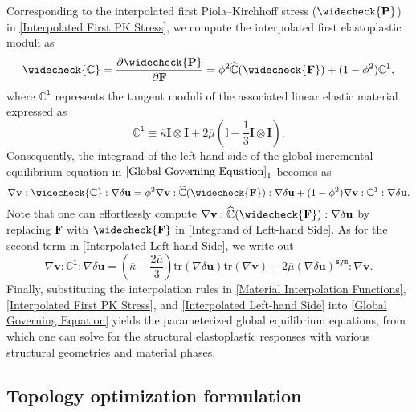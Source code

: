 \documentclass[preprint,11pt]{elsarticle}
\theoremstyle{definition}
\begin{document}
Corresponding to the interpolated first Piola--Kirchhoff stress ($\widecheck{\mathbf{P}}$) in \eqref{Interpolated First PK Stress}, we compute the interpolated first elastoplastic moduli as
\begin{equation*}
    \widecheck{\mathbb{C}} = \dfrac{\partial \widecheck{\mathbf{P}}}{\partial \mathbf{F}}
    = \phi^2 \widehat{\mathbb{C}}(\widecheck{\mathbf{F}}) + (1-\phi^2) \mathbb{C}^\texttt{l},
\end{equation*}
where $\mathbb{C}^\texttt{l}$ represents the tangent moduli of the associated linear elastic material expressed as
\begin{equation*}
    \mathbb{C}^\texttt{l} \equiv \overline{\kappa} \mathbf{I} \otimes \mathbf{I} + 2 \overline{\mu} \left( \mathbb{I} - \dfrac{1}{3} \mathbf{I} \otimes \mathbf{I} \right).
\end{equation*}
Consequently, the integrand of the left-hand side of the global incremental equilibrium equation in $\eqref{Global Governing Equation}_1$ becomes as
\begin{equation} \label{Interpolated Left-hand Side}
    \nabla \mathbf{v} : \widecheck{\mathbb{C}} : \nabla \delta \mathbf{u} = \phi^2 \nabla \mathbf{v} : \widehat{\mathbb{C}}(\widecheck{\mathbf{F}}) : \nabla \delta \mathbf{u} + (1-\phi^2) \nabla \mathbf{v} : \mathbb{C}^\texttt{l} : \nabla \delta \mathbf{u}.
\end{equation}
Note that one can effortlessly compute $\nabla \mathbf{v} : \widehat{\mathbb{C}}(\widecheck{\mathbf{F}}) : \nabla \delta \mathbf{u}$ by replacing $\mathbf{F}$ with $\widecheck{\mathbf{F}}$ in \eqref{Integrand of Left-hand Side}. As for the second term in \eqref{Interpolated Left-hand Side}, we write out
\begin{equation*}
    \nabla \mathbf{v} : \mathbb{C}^\texttt{l} : \nabla \delta \mathbf{u}
    = \left( \overline{\kappa} - \dfrac{2\overline{\mu}}{3} \right) \text{tr} (\nabla \delta \mathbf{u}) \text{tr} (\nabla \mathbf{v}) 
    + 2\overline{\mu} (\nabla \delta \mathbf{u})^\texttt{sym} : \nabla \mathbf{v}.
\end{equation*}
Finally, substituting the interpolation rules in \eqref{Material Interpolation Functions}, \eqref{Interpolated First PK Stress}, and \eqref{Interpolated Left-hand Side} into \eqref{Global Governing Equation} yields the parameterized global equilibrium equations, from which one can solve for the structural elastoplastic responses with various structural geometries and material phases.

\subsection{Topology optimization formulation}
\end{document}
